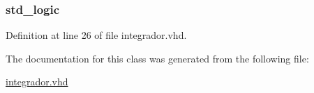 \subsubsection[{sinc\+\_\+int}]{ {\bfseries \textcolor{comment}{std\+\_\+logic}\textcolor{vhdlchar}{ }} \hspace{0.3cm}{\ttfamily [Signal]}}\label{classintegrador_1_1integrador_a45126d1a75be347f440d181b7aa5e033}


Definition at line 26 of file integrador.\+vhd.



The documentation for this class was generated from the following file\+:\begin{DoxyCompactItemize}
\item 
\hyperlink{integrador_8vhd}{integrador.\+vhd}\end{DoxyCompactItemize}
